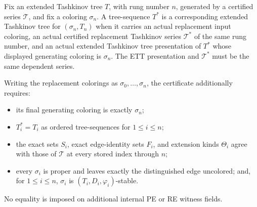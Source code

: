 \begin{definition}
Fix an extended Tashkinov tree \(T\), with rung number \(n\), generated
by a certified series \(\mathcal T\), and fix a coloring \(\sigma_n\).
A tree-sequence \(T^*\) is a corresponding extended Tashkinov tree for
\((\sigma_n,T_n)\) when it carries an actual replacement input coloring,
an actual certified replacement Tashkinov series \(\mathcal T^*\) of the
same rung number, and an actual extended Tashkinov tree presentation of
\(T^*\) whose displayed generating coloring is \(\sigma_n\).  The ETT
presentation and \(\mathcal T^*\) must be the same dependent series.

Writing the replacement colorings as
\(\sigma_0,\ldots,\sigma_n\), the certificate additionally requires:
\begin{itemize}
\item its final generating coloring is exactly \(\sigma_n\);
\item \(T_i^*=T_i\) as ordered tree-sequences for \(1\leq i\leq n\);
\item the exact sets \(S_i\), exact edge-identity sets \(F_i\), and
extension kinds \(\Theta_i\) agree with those of \(\mathcal T\) at every
stored index through \(n\);
\item every \(\sigma_i\) is proper and leaves exactly the distinguished
edge uncolored; and, for \(1\leq i\leq n\), \(\sigma_i\) is
\((T_i,D_i,\varphi_i)\)-stable.
\end{itemize}
No equality is imposed on additional internal PE or RE witness fields.
\end{definition}
